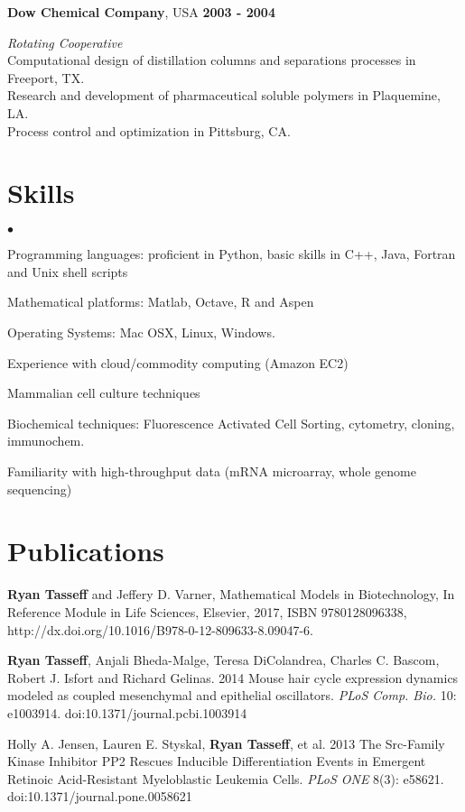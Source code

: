\documentclass[margin,line]{res}
\newenvironment{list2}{
  \begin{list}{$\bullet$}{%
      \setlength{\itemsep}{0in}
      \setlength{\parsep}{0in} \setlength{\parskip}{0in}
      \setlength{\topsep}{0in} \setlength{\partopsep}{0in} 
      \setlength{\leftmargin}{0.2in}}}{\end{list}}
\begin{document}
\begin{resume}
{\bf Dow Chemical Company},  USA \hfill {\bf 2003 - 2004}

\vspace{-.35cm}
{\em Rotating Cooperative}\\
Computational design of distillation columns and separations processes in Freeport, TX.\\
Research and development of pharmaceutical soluble polymers in Plaquemine, LA.\\
Process control and optimization in Pittsburg, CA.  


\section{\sc Skills} 
\begin{list2}
\item Programming languages: proficient in Python, basic skills in C++, Java, Fortran and Unix shell scripts 
\item Mathematical platforms:  Matlab, Octave, R and Aspen
\item Operating Systems:  Mac OSX, Linux, Windows.
\item Experience with cloud/commodity computing (Amazon EC2)
\item Mammalian cell culture techniques
\item Biochemical techniques: Fluorescence Activated Cell Sorting, cytometry, cloning, immunochem.
\item Familiarity with high-throughput data (mRNA microarray, whole genome sequencing)
\end{list2}



\section{\sc Publications}

{\bf Ryan Tasseff} and  Jeffery D. Varner, Mathematical Models in Biotechnology, 
In Reference Module in Life Sciences, 
Elsevier, 2017, ISBN 9780128096338, 
http://dx.doi.org/10.1016/B978-0-12-809633-8.09047-6.

{\bf Ryan Tasseff}, Anjali Bheda-Malge, Teresa DiColandrea, Charles C. Bascom, Robert J. Isfort and Richard Gelinas. 2014
Mouse hair cycle expression dynamics modeled as coupled mesenchymal and epithelial oscillators.  
{\it PLoS Comp. Bio. } 10: e1003914. doi:10.1371/journal.pcbi.1003914

Holly A. Jensen, Lauren E. Styskal, {\bf Ryan Tasseff}, et al. 2013
The Src-Family Kinase Inhibitor PP2 Rescues Inducible Differentiation Events 
in Emergent Retinoic Acid-Resistant Myeloblastic Leukemia Cells.
{\it PLoS ONE} 8(3): e58621. doi:10.1371/journal.pone.0058621


\end{resume}
\end{document}
